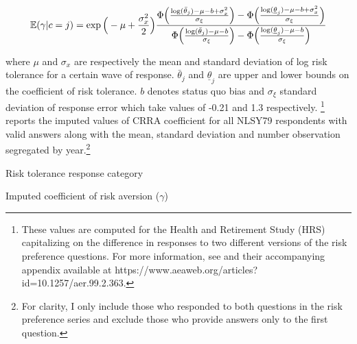 \documentclass[]{article}
\begin{document}
\begin{equation}
	\mathbb E(\gamma|c=j)=\exp\Big(-\mu+{\sigma_x^2\over 2}\Big){\Phi\Big({\log(\bar{\theta}_j)-\mu-b+\sigma_x^2\over \sigma_{\xi}}\Big)-\Phi\Big({\log(\underline{\theta}_j)-\mu-b+\sigma_x^2\over \sigma_{\xi}}\Big)\over \Phi\Big({\log(\bar{\theta}_j)-\mu-b\over \sigma_\xi}\Big)-\Phi\Big({\log(\underline{\theta}_j)-\mu-b\over \sigma_\xi}\Big)}
	\label{eq:1-conditional-expectation}
\end{equation}

where $\mu$ and $\sigma_x$ are respectively the mean and standard deviation of log risk tolerance for a certain wave of response. $\bar \theta_j$ and $\underline{\theta}_j$ are upper and lower bounds on the coefficient of risk tolerance. $b$ denotes status quo bias and $\sigma_\xi$ standard deviation of response error which take values of -0.21 and 1.3 respectively. \footnote{These values are computed for the Health and Retirement Study (HRS) capitalizing on the difference in responses to two different versions of the risk preference questions. For more information, see \citet{kimball2009risk} and their accompanying appendix available at https://www.aeaweb.org/articles?id=10.1257/aer.99.2.363.}  reports the imputed values of CRRA coefficient for all NLSY79 respondents with valid answers along with the mean, standard deviation and number observation segregated by year.\footnote{For clarity, I only include those who responded to both questions in the risk preference series and exclude those who provide answers only to the first question.} 

\begin{table}[!t]
	\centering
	\setlength{\extrarowheight}{0.3em}
	\caption{Risk tolerance response category}	
	
	\label{table:2-risk-bound}
\end{table}

\begin{table}[!b]
	\centering
	\setlength{\extrarowheight}{0.3em}
	\caption{Imputed coefficient of risk aversion ($\gamma$)}	
	
	\label{table:3-imputed-risk}
\end{table}
\end{document}
